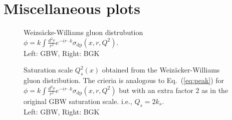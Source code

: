 \documentclass[11pt]{article}
\begin{document}
\printbibliography
\appendix
\section{Miscellaneous plots}





\begin{figure}[H]
\caption{Weizs\"acke-Williams gluon distrubution $\phi=k\int \frac{d^2r}{r^2} e^{-i r\cdot k} \sigma_{\mathrm{dp}}(x,r,Q^2)$.\\Left: GBW, Right: BGK
}
\end{figure}

\begin{figure}[H]
\caption{Saturation scale $Q_s^2(x)$  obtained from the Weiz\"acker-Williams gluon distribution.
The crieria is analogous to Eq.~(\ref{eq:peak}) for $\phi=k\int \frac{d^2r}{r^2} e^{-i r\cdot k} \sigma_{\mathrm{dp}}(x,r,Q^2)$ but with an extra factor 2 as in the original GBW saturation scale.  i.e., $Q_s=2 k_s$.\\Left: GBW, Right: BGK }
\end{figure}
\end{document}
